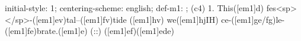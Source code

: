 initial-style: 1;
centering-scheme: english;
def-m1: \grealign;
(c4) 1. This([em1]d) fes<sp> </sp>-([em1]ev)tal--([em1]fv)tide ([em1]hv) we([em1]hjIH) ce-([em1]ge/fg)le-([em1]fe)brate.([em1]e) (::) ([em1]ef)([em1]ede)